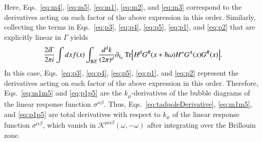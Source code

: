\documentclass[twocolumn,superscriptaddress]{revtex4-1}
\newcommand{\smrm}[1]{_{\mathrm{#1}}}
\begin{document}
Here, Eqs.~\eqref{eq:m4}, \eqref{eq:m5}, \eqref{eq:m1}, \eqref{eq:m2}, and \eqref{eq:m3} correspond to the derivatives acting on each factor of the above expression in this order.
Similarly, collecting the terms in Eqs.~\eqref{eq:p3}, \eqref{eq:p4}, \eqref{eq:p5}, \eqref{eq:p1}, and \eqref{eq:p2} that are explicitly linear in $\Gamma$ yields
\begin{align}
  \frac{2i\Gamma}{2\pi i} \int dx f(x) \int\smrm{BZ} \frac{d^d k}{(2\pi)^d}\partial_{k_\mu} \Tr[H^\beta G^R(x+\hbar\omega) H^\alpha G^A(x)G^R(x)]. \label{eq:p1p5}
\end{align}
In this case, Eqs.~\eqref{eq:p3}, \eqref{eq:p4}, \eqref{eq:p5}, \eqref{eq:p1}, and \eqref{eq:p2} represent the derivatives acting on each factor of the above expression in this order.
Therefore, Eqs.~\eqref{eq:m1m5} and \eqref{eq:p1p5} are the $k_\mu$-derivatives of the bubble diagrams of the linear response function $\sigma^{\alpha\beta}$.
Thus, Eqs.~\eqref{eq:tadpoleDerivative}, \eqref{eq:m1m5}, and \eqref{eq:p1p5} are total derivatives with respect to $k_\mu$ of the linear response function $\sigma^{\alpha\beta}$, which vanish in $\mathcal{K}^{\mu\alpha\beta}(\omega,-\omega)$
after integrating over the Brillouin zone.
\end{document}
